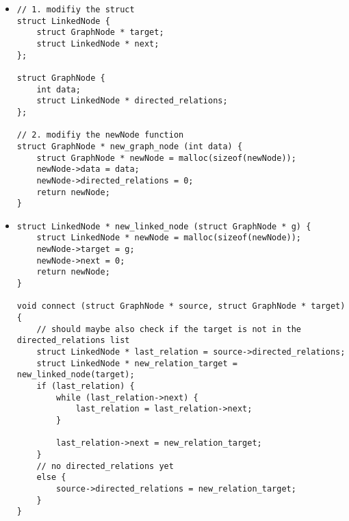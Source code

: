 \begin{itemize}
    \item {}

\begin{lstlisting}
// 1. modifiy the struct
struct LinkedNode {
    struct GraphNode * target;
    struct LinkedNode * next;
};

struct GraphNode {
    int data;
    struct LinkedNode * directed_relations;
};

// 2. modifiy the newNode function
struct GraphNode * new_graph_node (int data) {
    struct GraphNode * newNode = malloc(sizeof(newNode));
    newNode->data = data;
    newNode->directed_relations = 0;
    return newNode;
}
\end{lstlisting}

    \item {}

\begin{lstlisting}
struct LinkedNode * new_linked_node (struct GraphNode * g) {
    struct LinkedNode * newNode = malloc(sizeof(newNode));
    newNode->target = g;
    newNode->next = 0;
    return newNode;
}

void connect (struct GraphNode * source, struct GraphNode * target) {
    // should maybe also check if the target is not in the directed_relations list
    struct LinkedNode * last_relation = source->directed_relations;
    struct LinkedNode * new_relation_target = new_linked_node(target);
    if (last_relation) {
        while (last_relation->next) {
            last_relation = last_relation->next;
        }

        last_relation->next = new_relation_target;
    }
    // no directed_relations yet
    else {
        source->directed_relations = new_relation_target;
    }
}
\end{lstlisting}


\end{itemize}

